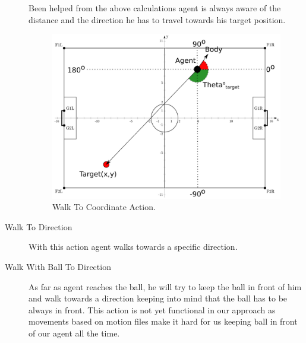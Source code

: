 \begin{description}
Been helped from the above calculations agent is always aware of the distance and the direction he has to travel towards his target position. 
 \begin{figure}[!h]
\centering
  \includegraphics[scale=0.6]{Chapter3/figures/GoToPos.pdf}
  \caption{Walk To Coordinate Action.}
  \label{fig:WalkToCoordinate}
\end{figure}
 \item[Walk To Direction]
 With this action agent walks towards a specific direction.
 \item[Walk With Ball To Direction]
 As far as agent reaches the ball, he will try to keep the ball in front of him and walk towards a direction keeping into mind that the ball has to be always in front. This action is not yet functional in our approach as movements based on motion files make it hard for us keeping ball in front of our agent all the time.
\end{description}

